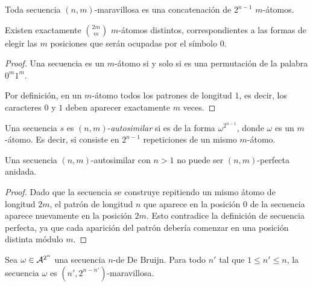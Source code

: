 \documentclass[11pt]{article}
\begin{document}
\begin{remark}
	Toda secuencia $(n,m)$-maravillosa es una concatenación de $2^{n-1}$
	$m$-átomos.
\end{remark}

\begin{proposition}
	Existen exactamente $\binom{2m}{m}$ $m$-átomos distintos, correspondientes a
	las formas de elegir las $m$ posiciones que serán ocupadas por el símbolo
	$0$.
\end{proposition}

\begin{proof}
	Una secuencia es un $m$-átomo si y solo si es una permutación de la palabra
	$0^m1^m$.

	Por definición, en un $m$-átomo todos los patrones de longitud $1$, es
	decir, los caracteres $0$ y $1$ deben aparecer exactamente $m$ veces.
\end{proof}


\begin{definition}
	Una secuencia $s$ es $(n,m)$-\emph{autosimilar} si es de la forma
	$\omega^{2^{n-1}}$, donde $\omega$ es un $m$-átomo. Es decir, si consiste
	en $2^{n-1}$ repeticiones de un mismo $m$-átomo.
\end{definition}

\begin{remark}
	\label{lema:autosimilar-cannot-be-np}
	Una secuencia $(n,m)$-autosimilar con $n > 1$ no puede ser $(n,m)$-perfecta
	anidada.
\end{remark}

\begin{proof}
	Dado que la secuencia se construye repitiendo %
	un mismo
	átomo de longitud $2m$, el patrón de longitud $n$ que aparece en la posición
	$0$ de la secuencia aparece nuevamente en la posición $2m$. Esto contradice
	la definición de secuencia perfecta, ya que cada aparición del patrón debería
	comenzar en una posición distinta módulo $m$.
\end{proof}

\begin{lema}
	Sea $\omega \in \mathcal{A}^{2^n}$ una secuencia $n$-de De Bruijn. Para todo
	$n'$ tal que $1 \leq n' \leq n$, la secuencia $\omega$ es
	$(n',2^{n-n'})$-maravillosa.
\end{lema}
\end{document}
